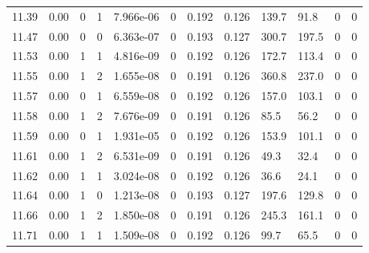 \documentclass[preview]{standalone}
\begin{document}
{{{{{{{{\begin{tabular}{L{1.2cm}C{1.2cm} C{0.3cm}C{0.5cm} C{1.4cm}C{1.4cm} C{1.4cm}C{1.4cm} C{1.6cm}C{1.6cm} C{1.6cm}C{1.6cm}}
  11.39  &  0.00  & 0     &  1 &  7.966e-06  & 0  &  0.192&   0.126& 139.7 & 91.8   &  0 & 0  \\ 
  11.47  &  0.00  & 0     &  0 &  6.363e-07  & 0  &  0.193&   0.127& 300.7 & 197.5   &  0 & 0  \\ 
  11.53  &  0.00  & 1     &  1 &  4.816e-09  & 0  &  0.192&   0.126& 172.7 & 113.4   &  0 & 0  \\ 
  11.55  &  0.00  & 1     &  2 &  1.655e-08  & 0  &  0.191&   0.126& 360.8 & 237.0   &  0 & 0  \\ 
  11.57  &  0.00  & 0     &  1 &  6.559e-08  & 0  &  0.192&   0.126& 157.0 & 103.1   &  0 & 0  \\ 
  11.58  &  0.00  & 1     &  2 &  7.676e-09  & 0  &  0.191&   0.126& 85.5 & 56.2   &  0 & 0  \\ 
  11.59  &  0.00  & 0     &  1 &  1.931e-05  & 0  &  0.192&   0.126& 153.9 & 101.1   &  0 & 0  \\ 
  11.61  &  0.00  & 1     &  2 &  6.531e-09  & 0  &  0.191&   0.126& 49.3 & 32.4   &  0 & 0  \\ 
  11.62  &  0.00  & 1     &  1 &  3.024e-08  & 0  &  0.192&   0.126& 36.6 & 24.1   &  0 & 0  \\ 
  11.64  &  0.00  & 1     &  0 &  1.213e-08  & 0  &  0.193&   0.127& 197.6 & 129.8   &  0 & 0  \\ 
  11.66  &  0.00  & 1     &  2 &  1.850e-08  & 0  &  0.191&   0.126& 245.3 & 161.1   &  0 & 0  \\ 
  11.71  &  0.00  & 1     &  1 &  1.509e-08  & 0  &  0.192&   0.126& 99.7 & 65.5   &  0 & 0  \\ 
\hline 
\end{tabular} 

}}}}}}}}
\end{document}
